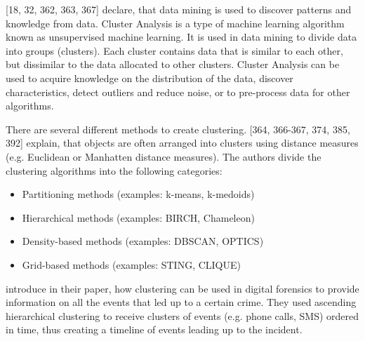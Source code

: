 




\textcite{han2011data}[18, 32, 362, 363, 367] declare, that data mining is used to discover patterns and knowledge from data.
Cluster Analysis is a type of machine learning algorithm known as unsupervised machine learning. It is used in data mining to divide data into groups (clusters). Each cluster contains data that is similar to each other, but dissimilar to the data allocated to other clusters. Cluster Analysis can be used to acquire knowledge on the distribution of the data, discover characteristics, detect outliers and reduce noise, or to pre-process data for other algorithms. 

There are several different methods to create clustering. \textcite{han2011data}[364, 366-367, 374, 385, 392] explain, that objects are often arranged into clusters using distance measures (e.g. Euclidean or Manhatten distance measures). 
The authors divide the clustering algorithms into the following categories:
\begin{itemize}
	\item Partitioning methods (examples: k-means, k-medoids)
	\item Hierarchical methods (examples: BIRCH, Chameleon)
	\item Density-based methods (examples: DBSCAN, OPTICS)
	\item Grid-based methods (examples: STING, CLIQUE)
\end{itemize}




\textcite{forensics} introduce in their paper, how clustering can be used in digital forensics to provide information on all the events that led up to a certain crime. They used ascending hierarchical clustering to receive clusters of events (e.g. phone calls, SMS) ordered in time, thus creating a timeline of events leading up to the incident.

